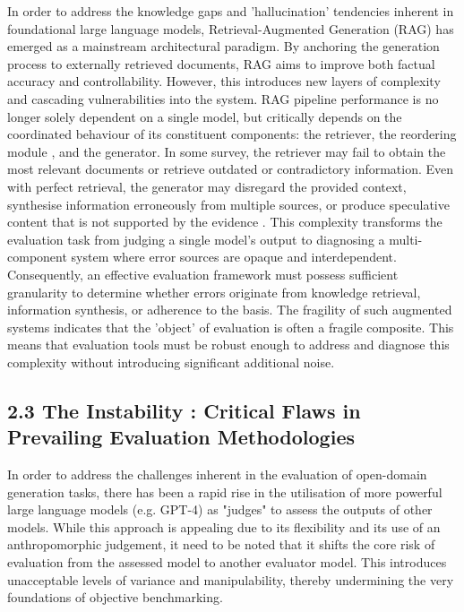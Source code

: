 In order to address the knowledge gaps and 'hallucination' tendencies inherent in foundational large language models, Retrieval-Augmented Generation (RAG) has emerged as a mainstream architectural paradigm\cite{liu2024much}. By anchoring the generation process to externally retrieved documents, RAG aims to improve both factual accuracy and controllability\cite{gao2023retrieval}\cite{guu2020retrieval}. However, this introduces new layers of complexity and cascading vulnerabilities into the system\cite{agrawal2024mindful}. RAG pipeline performance is no longer solely dependent on a single model, but critically depends on the coordinated behaviour of its constituent components: the retriever, the reordering module , and the generator\cite{gao2023retrieval}\cite{yan2024corrective}.
In some survey, the retriever may fail to obtain the most relevant documents or retrieve outdated or contradictory information\cite{wang2025retrieval}. Even with perfect retrieval, the generator may disregard the provided context, synthesise information erroneously from multiple sources, or produce speculative content that is not supported by the evidence \cite{yu2024evaluation}. This complexity transforms the evaluation task from judging a single model's output to diagnosing a multi-component system where error sources are opaque and interdependent\cite{wang2024evaluating}. Consequently, an effective evaluation framework must possess sufficient granularity to determine whether errors originate from knowledge retrieval, information synthesis, or adherence to the basis\cite{es2024ragas}. The fragility of such augmented systems indicates that the 'object' of evaluation is often a fragile composite. This means that evaluation tools must be robust enough to address and diagnose this complexity without introducing significant additional noise\cite{ni2025towards}\cite{yu2024evaluation}.

\subsection{2.3 The Instability : Critical Flaws in Prevailing Evaluation Methodologies}

In order to address the challenges inherent in the evaluation of open-domain generation tasks, there has been a rapid rise in the utilisation of more powerful large language models (e.g. GPT-4) as "judges" to assess the outputs of other models\cite{li2025generation}\cite{zheng2023judging}\cite{szymanski2025limitations}. While this approach is appealing due to its flexibility and its use of an anthropomorphic judgement, it need to be noted that it shifts the core risk of evaluation from the assessed model to another evaluator model. This introduces unacceptable levels of variance and manipulability, thereby undermining the very foundations of objective benchmarking\cite{wataoka2024self}\cite{wei2024systematic}.


